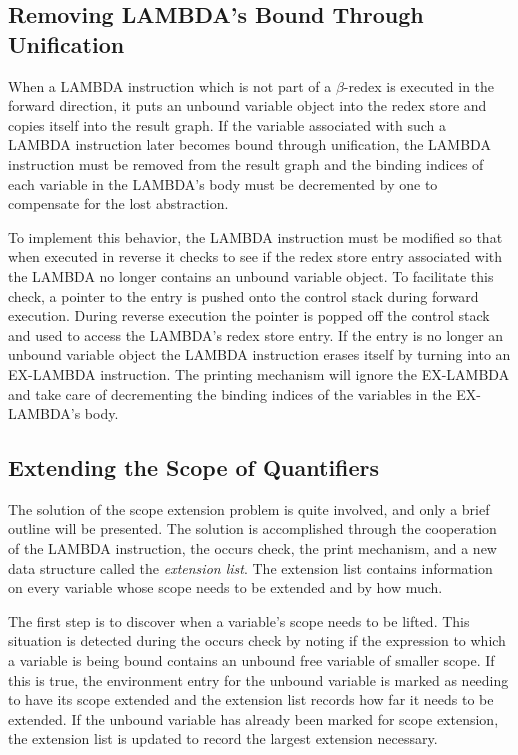 \subsection{Removing LAMBDA's Bound Through Unification}

When a LAMBDA instruction which is not part of a \(\beta\)-redex is executed in
the forward direction, it puts an unbound variable object into the redex store
and copies itself into the result graph. If the variable associated with such a
LAMBDA instruction later becomes bound through unification, the LAMBDA
instruction must be removed from the result graph and the binding indices of
each variable in the LAMBDA's body must be decremented by one to compensate for
the lost abstraction.

To implement this behavior, the LAMBDA instruction must be modified so that when
executed in reverse it checks to see if the redex store entry associated with
the LAMBDA no longer contains an unbound variable object. To facilitate this
check, a pointer to the entry is pushed onto the control stack during forward
execution. During reverse execution the pointer is popped off the control stack
and used to access the LAMBDA's redex store entry. If the entry is no longer an
unbound variable object the LAMBDA instruction erases itself by turning into an
EX-LAMBDA instruction. The printing mechanism will ignore the EX-LAMBDA and take
care of decrementing the binding indices of the variables in the EX-LAMBDA's
body.

\subsection{Extending the Scope of Quantifiers}

The solution of the scope extension problem is quite involved, and only a brief
outline will be presented. The solution is accomplished through the cooperation
of the LAMBDA instruction, the occurs check, the print mechanism, and a new data
structure called the \emph{extension list}. The extension list contains information on
every variable whose scope needs to be extended and by how much.

The first step is to discover when a variable's scope needs to be lifted. This
situation is detected during the occurs check by noting if the expression to
which a variable is being bound contains an unbound free variable of smaller
scope. If this is true, the environment entry for the unbound variable is marked
as needing to have its scope extended and the extension list records how far it
needs to be extended. If the unbound variable has already been marked for scope
extension, the extension list is updated to record the largest extension
necessary.

